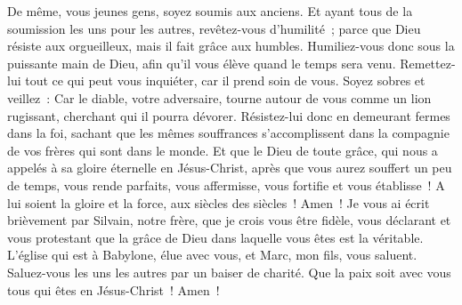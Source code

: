 \begin{multicols}{2}
De même, vous jeunes gens, soyez soumis aux anciens. Et ayant tous de la soumission les uns pour les autres, revêtez-vous  d'humilité~; parce que Dieu résiste aux orgueilleux, mais il fait grâce aux humbles. 
Humiliez-vous donc sous la puissante main de Dieu, afin qu'il vous élève quand le temps sera venu.
Remettez-lui tout ce qui peut vous inquiéter, car il prend soin de vous.
Soyez sobres et veillez~: Car le diable, votre adversaire, tourne autour de vous comme un lion rugissant, cherchant qui il pourra dévorer. 
Résistez-lui donc en demeurant fermes dans la foi, sachant que les mêmes souffrances s'accomplissent dans la compagnie de vos frères qui sont dans le monde. 
Et que le Dieu de toute grâce, qui nous a appelés à sa gloire éternelle en Jésus-Christ, après que vous aurez souffert un peu de temps, vous rende parfaits, vous affermisse, vous fortifie et vous établisse~! 
A lui soient la gloire et la force, aux siècles des siècles~! Amen~!
Je vous ai écrit brièvement par Silvain, notre frère, que je crois vous être fidèle, vous déclarant et vous protestant que la grâce de Dieu dans laquelle vous êtes est la véritable. 
L'église qui est à Babylone, élue avec vous, et Marc, mon fils, vous saluent. 
Saluez-vous les uns les autres par un baiser de charité. Que la paix soit avec vous tous qui êtes en Jésus-Christ~! Amen~!
\PPE{}
\end{multicols}
